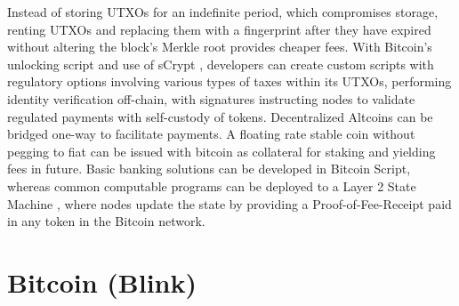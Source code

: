 \documentclass[a4paper,10pt]{article}
\begin{document}
Instead of storing UTXOs for an indefinite period, which compromises storage, renting UTXOs and replacing them with a fingerprint after they have expired without altering the block’s Merkle root provides cheaper fees. With Bitcoin’s unlocking script and use of sCrypt \cite{sCrypt}, developers can create custom scripts with regulatory options involving various types of taxes within its UTXOs, performing identity verification off-chain, with signatures instructing nodes to validate regulated payments with self-custody of tokens. Decentralized Altcoins can be bridged one-way to facilitate payments. A floating rate stable coin \cite{stablecoin} without pegging to fiat can be issued with bitcoin as collateral for staking and yielding fees in future. Basic banking solutions can be developed in Bitcoin Script, whereas common computable programs can be deployed to a Layer 2 State Machine \cite{wood2014ethereum}, where nodes update the state by providing a Proof-of-Fee-Receipt paid in any token in the Bitcoin network.

\section{Bitcoin (Blink)} 
\end{document}
